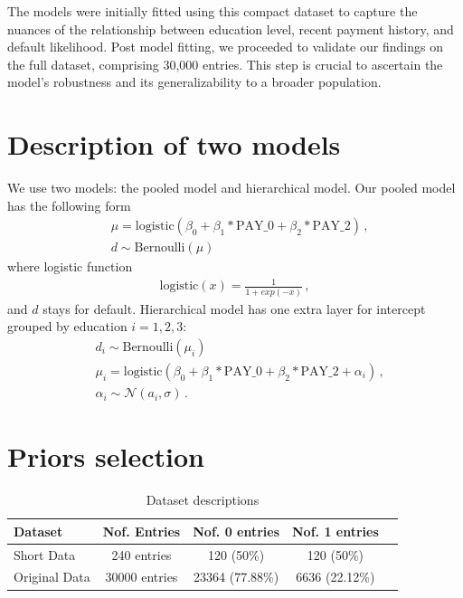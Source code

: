 \documentclass[a4paper]{artikel3}
\begin{document}
The models were initially fitted using this compact dataset to capture the nuances of the relationship between education level, recent payment history, and default likelihood. Post model fitting, we proceeded to validate our findings on the full dataset, comprising 30,000 entries. This step is crucial to ascertain the model's robustness and its generalizability to a broader population.

\section{Description of two models} 

We use two models: the pooled model and hierarchical  model. 
Our pooled model has the following form
\begin{align*}
    &\mu = \text{logistic}(\beta_0 + \beta_1 * \text{PAY\_0} + \beta_2 * \text{PAY\_2})\,, \\\nonumber
    &d \sim \text{Bernoulli}(\mu)
\end{align*}
where logistic function
\begin{align*}
    \text{logistic}(x) = \frac{1}{1+exp(-x)}\,,
\end{align*}
and $d$ stays for default.
Hierarchical model has one extra layer for intercept grouped by education $i = 1,2,3$:
\begin{align*}
    &d_i \sim \text{Bernoulli}(\mu_i) \\\nonumber
    &\mu_i = \text{logistic}(\beta_0 + \beta_1 * \text{PAY\_0} + \beta_2 * \text{PAY\_2} + \alpha_i)\,, \\\nonumber
    &\alpha_i  \sim  \mathcal{N}(a_i,\sigma)\,.     
\end{align*}


\section{Priors selection}
\begin{table}[h!]
  \centering
  \caption{Dataset descriptions}
  \label{tab:data_description}
  \begin{tabular}{lcccc}
    \toprule
    \textbf{Dataset} & \textbf{Nof. Entries} & \textbf{Nof. 0 entries} & \textbf{Nof. 1 entries} \\
    \midrule
    Short Data & 240 entries & 120 (50\%) & 120 (50\%) \\
    Original Data & 30000 entries & 23364 (77.88\%) & 6636 (22.12\%) \\
    \bottomrule
  \end{tabular}
\end{table}
\end{document}
